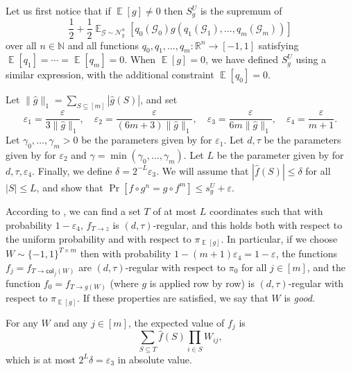 \documentclass{article}
\theoremstyle{definition}
\theoremstyle{remark}
\providecommand{\col}{\mathsf{col}}
\DeclareMathOperator*{\E}{\mathbb{E}}
\providecommand{\cG}{\mathcal{G}}
\providecommand{\normal}{\mathcal{N}}
\providecommand{\normalg}[1]{\normal_{#1}}
\newcommand\eps{\varepsilon}
\renewcommand\epsilon{\eps}
\renewcommand\leq{\leqslant}
\begin{document}
Let us first notice that if $\E[g] \neq 0$ then $S_g^U$ is the supremum of
\[
 \frac{1}{2} + \frac{1}{2} \E_{\cG \sim \normalg{g}^n}[q_0(\cG_0) g(q_1(\cG_1), \ldots, q_m(\cG_m))]
\]
over all $n \in \mathbb{N}$ and all functions $q_0,q_1,\ldots,q_m\colon \mathbb{R}^n \to [-1,1]$ satisfying $\E[q_1] = \cdots = \E[q_m] = 0$.
When $\E[g] = 0$, we have defined $S_g^U$ using a similar expression, with the additional constraint $\E[q_0] = 0$.

Let $\|\hat{g}\|_1 = \sum_{S \subseteq [m]} |\hat{g}(S)|$, and set
\[
 \epsilon_1 = \frac{\epsilon}{3\|\hat{g}\|_1}, \quad
 \epsilon_2 = \frac{\epsilon}{(6m+3)\|\hat{g}\|_1}, \quad
 \epsilon_3 = \frac{\epsilon}{6m\|\hat{g}\|_1}, \quad
 \epsilon_4 = \frac{\epsilon}{m+1}.
\]
Let $\gamma_0,\ldots,\gamma_m > 0$ be the parameters given by  for $\epsilon_1$. Let $d,\tau$ be the parameters given by  for $\epsilon_2$ and $\gamma = \min(\gamma_0,\ldots,\gamma_m)$. Let $L$ be the parameter given by  for $d,\tau,\epsilon_4$. Finally, we define $\delta = 2^{-L} \epsilon_3$. We will assume that $|\hat{f}(S)| \leq \delta$ for all $|S| \leq L$, and show that $\Pr[f \circ g^n = g \circ f^m] \leq s^U_g + \epsilon$.

According to , we can find a set $T$ of at most $L$ coordinates such that with probability $1-\epsilon_4$, $f_{T \to z}$ is $(d,\tau)$-regular, and this holds both with respect to the uniform probability and with respect to $\pi_{\E[g]}$. In particular, if we choose $W \sim \{-1,1\}^{T \times m}$ then with probability $1 - (m+1)\epsilon_4 = 1 - \epsilon$, the functions $f_j = f_{T \to \col_j(W)}$ are $(d,\tau)$-regular with respect to $\pi_0$ for all $j \in [m]$, and the function $f_0 = f_{T \to g(W)}$ (where $g$ is applied row by row) is $(d,\tau)$-regular with respect to $\pi_{\E[g]}$. If these properties are satisfied, we say that $W$ is \emph{good}.

For any $W$ and any $j \in [m]$, the expected value of $f_j$ is
\[
 \sum_{S \subseteq T} \hat{f}(S) \prod_{i \in S} W_{ij},
\]
which is at most $2^L \delta = \epsilon_3$ in absolute value.
\end{document}
